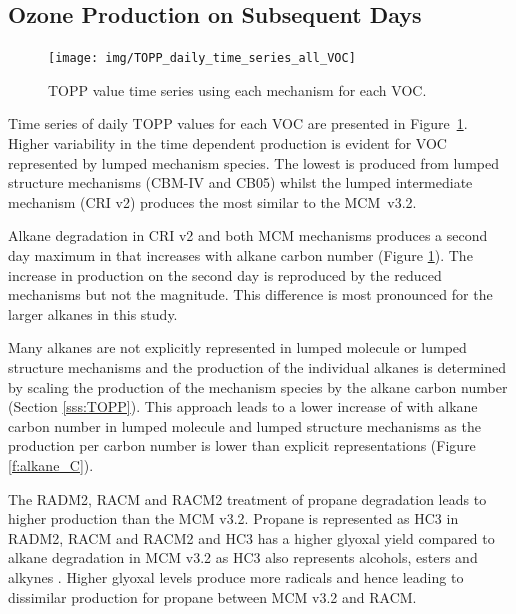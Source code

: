 \subsection{Ozone Production on Subsequent Days} \label{ss:profiles} %

\begin{figure}
    \centering
    \texttt{[image: img/TOPP\_daily\_time\_series\_all\_VOC]}
    \vspace{0mm}
    \caption{TOPP value time series using each mechanism for each VOC.}
    \vspace{-4mm}
    \label{f:TOPP_dailies}
\end{figure}

Time series of daily TOPP values for each VOC are presented in \mbox{Figure \ref{f:TOPP_dailies}}. 
Higher variability in the time dependent  production is evident for VOC represented by lumped mechanism species.
The lowest  is produced from lumped structure mechanisms (CBM-IV and CB05) whilst the lumped intermediate mechanism (CRI v2) produces the most similar  to the \mbox{MCM v3.2}.

Alkane degradation in CRI v2 and both MCM mechanisms produces a second day maximum in  that increases with alkane carbon number (Figure \ref{f:TOPP_dailies}).
The increase in  production on the second day is reproduced by the reduced mechanisms but not the magnitude.
This difference is most pronounced for the larger alkanes in this study.

Many alkanes are not explicitly represented in lumped molecule or lumped structure mechanisms and the  production of the individual alkanes is determined by scaling the  production of the mechanism species by the alkane carbon number (Section \ref{sss:TOPP}).
This approach leads to a lower increase of  with alkane carbon number in lumped molecule and lumped structure mechanisms as the  production per carbon number is lower than explicit representations (Figure \ref{f:alkane_C}).

The RADM2, RACM and RACM2 treatment of propane degradation leads to higher  production than the MCM v3.2.
Propane is represented as HC3 in RADM2, RACM and RACM2 and HC3 has a higher glyoxal yield compared to alkane degradation in MCM v3.2 as HC3 also represents alcohols, esters and alkynes \citep{Stockwell:1990, Stockwell:1997, Goliff:2013}.
Higher glyoxal levels produce more radicals and hence  leading to dissimilar  production for propane between MCM v3.2 and RACM.

